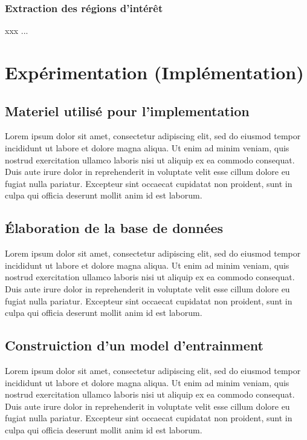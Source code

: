 \documentclass[12pt,a4paper,twoside]{report}
\begin{document}
		
		
		\subsection{Extraction des régions d'intérêt}
			xxx ...
		
		
		
	\chapter{Expérimentation (Implémentation) }
		\section{Materiel utilisé pour l'implementation}
			Lorem ipsum dolor sit amet, consectetur adipiscing elit, sed do eiusmod tempor incididunt ut labore et dolore magna aliqua. Ut enim ad minim veniam, quis nostrud exercitation ullamco laboris nisi ut aliquip ex ea commodo consequat. Duis aute irure dolor in reprehenderit in voluptate velit esse cillum dolore eu fugiat nulla pariatur. Excepteur sint occaecat cupidatat non proident, sunt in culpa qui officia deserunt mollit anim id est laborum.
		\section{Élaboration de la base de données}
			Lorem ipsum dolor sit amet, consectetur adipiscing elit, sed do eiusmod tempor incididunt ut labore et dolore magna aliqua. Ut enim ad minim veniam, quis nostrud exercitation ullamco laboris nisi ut aliquip ex ea commodo consequat. Duis aute irure dolor in reprehenderit in voluptate velit esse cillum dolore eu fugiat nulla pariatur. Excepteur sint occaecat cupidatat non proident, sunt in culpa qui officia deserunt mollit anim id est laborum.
			
		\section{Construiction d'un model d'entrainment}
			Lorem ipsum dolor sit amet, consectetur adipiscing elit, sed do eiusmod tempor incididunt ut labore et dolore magna aliqua. Ut enim ad minim veniam, quis nostrud exercitation ullamco laboris nisi ut aliquip ex ea commodo consequat. Duis aute irure dolor in reprehenderit in voluptate velit esse cillum dolore eu fugiat nulla pariatur. Excepteur sint occaecat cupidatat non proident, sunt in culpa qui officia deserunt mollit anim id est laborum.
\end{document}
